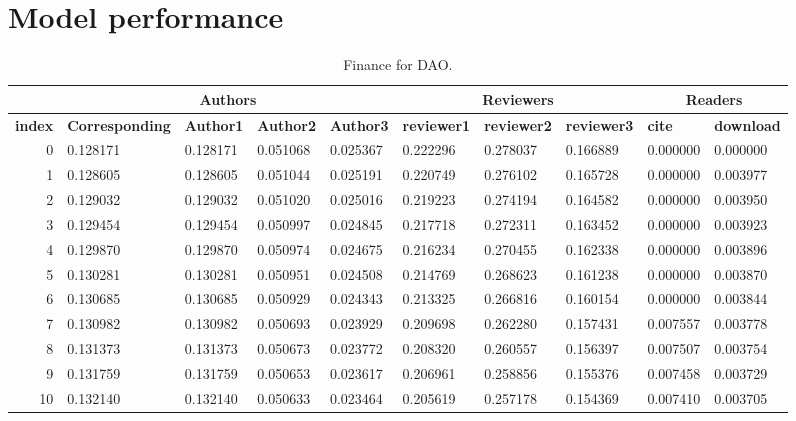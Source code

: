 \documentclass[lettersize,journal]{IEEEtran}
\begin{document}
\section{Model performance}


\begin{table}[ht!]
  \begin{center}
    \caption{Finance for DAO.}
    \label{tab:finance}
    \begin{tabular}{r|l|l|l|l|l|l|l|l|l} %
      & \multicolumn{4}{c}{\textbf{Authors}} & \multicolumn{3}{|c|}{\textbf{Reviewers}} & \multicolumn{2}{c}{\textbf{Readers}}\\
      \hline
      \textbf{index} & \textbf{Corresponding} & \textbf{Author1} & \textbf{Author2} & \textbf{Author3} & \textbf{reviewer1} & \textbf{reviewer2} & \textbf{reviewer3} & \textbf{cite} & \textbf{download}\\
      \hline
      0 & 0.128171 & 0.128171 & 0.051068 & 0.025367 & 0.222296 & 0.278037 & 0.166889 & 0.000000 & 0.000000 \\
      1 & 0.128605 & 0.128605 & 0.051044 & 0.025191 & 0.220749 & 0.276102 & 0.165728 & 0.000000 & 0.003977 \\
      2 & 0.129032 & 0.129032 & 0.051020 & 0.025016 & 0.219223 & 0.274194 & 0.164582 & 0.000000 & 0.003950 \\
      3 & 0.129454 & 0.129454 & 0.050997 & 0.024845 & 0.217718 & 0.272311 & 0.163452 & 0.000000 & 0.003923 \\
      4 & 0.129870 & 0.129870 & 0.050974 & 0.024675 & 0.216234 & 0.270455 & 0.162338 & 0.000000 & 0.003896 \\
      5 & 0.130281 & 0.130281 & 0.050951 & 0.024508 & 0.214769 & 0.268623 & 0.161238 & 0.000000 & 0.003870 \\
      6 & 0.130685 & 0.130685 & 0.050929 & 0.024343 & 0.213325 & 0.266816 & 0.160154 & 0.000000 & 0.003844 \\
      7 & 0.130982 & 0.130982 & 0.050693 & 0.023929 & 0.209698 & 0.262280 & 0.157431 & 0.007557 & 0.003778 \\
      8 & 0.131373 & 0.131373 & 0.050673 & 0.023772 & 0.208320 & 0.260557 & 0.156397 & 0.007507 & 0.003754 \\
      9 & 0.131759 & 0.131759 & 0.050653 & 0.023617 & 0.206961 & 0.258856 & 0.155376 & 0.007458 & 0.003729 \\
      10 & 0.132140 & 0.132140 & 0.050633 & 0.023464 & 0.205619 & 0.257178 & 0.154369 & 0.007410 & 0.003705 \\

\end{tabular}
\end{center}
\end{table}
\end{document}
